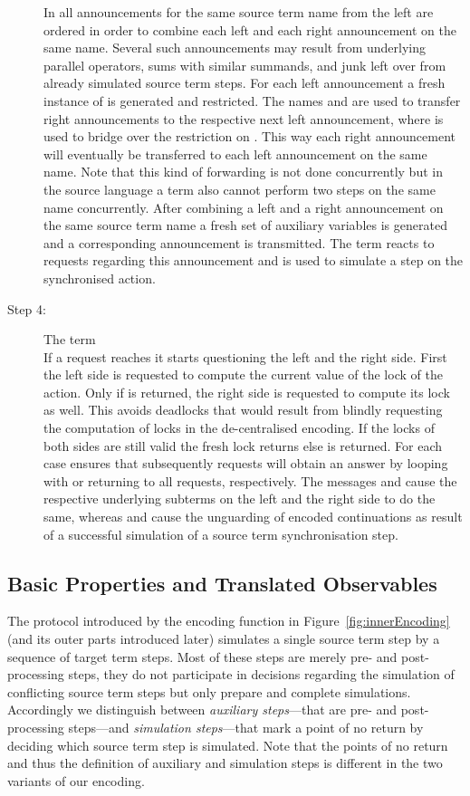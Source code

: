 \documentclass[]{eptcs}
\begin{document}
\begin{description}
		In  all announcements for the same source term name  from the left are ordered in order to combine each left and each right announcement on the same name. Several such announcements may result from underlying parallel operators, sums with similar summands, and junk left over from already simulated source term steps. For each left announcement a fresh instance of  is generated and restricted. The names  and  are used to transfer right announcements to the respective next left announcement, where  is used to bridge over the restriction on . This way each right announcement will eventually be transferred to each left announcement on the same name. Note that this kind of forwarding is not done concurrently but in the source language a term  also cannot perform two steps on the same name  concurrently. After combining a left and a right announcement on the same source term name a fresh set of auxiliary variables  is generated and a corresponding announcement is transmitted. The term  reacts to requests regarding this announcement and is used to simulate a step on the synchronised action.
	\item[Step 4:] The term \\
		If a request reaches  it starts questioning the left and the right side. First the left side is requested to compute the current value of the lock of the action. Only if  is returned, the right side is requested to compute its lock as well. This avoids deadlocks that would result from blindly requesting the computation of locks in the de-centralised encoding. If the locks of both sides are still valid the fresh lock  returns  else  is returned. For each case  ensures that subsequently requests will obtain an answer by looping with  or returning  to all requests, respectively. The messages  and  cause the respective underlying subterms on the left and the right side to do the same, whereas  and  cause the unguarding of encoded continuations as result of a successful simulation of a source term synchronisation step.
\end{description}

\subsection{Basic Properties and Translated Observables}

The protocol introduced by the encoding function in Figure~\ref{fig:innerEncoding} (and its outer parts introduced later) simulates a single source term step by a sequence of target term steps. Most of these steps are merely pre- and post-processing steps, \ie they do not participate in decisions regarding the simulation of conflicting source term steps but only prepare and complete simulations. Accordingly we distinguish between \emph{auxiliary steps}---that are pre- and post-processing steps---and \emph{simulation steps}---that mark a point of no return by deciding which source term step is simulated. Note that the points of no return and thus the definition of auxiliary and simulation steps is different in the two variants of our encoding.
\end{document}
